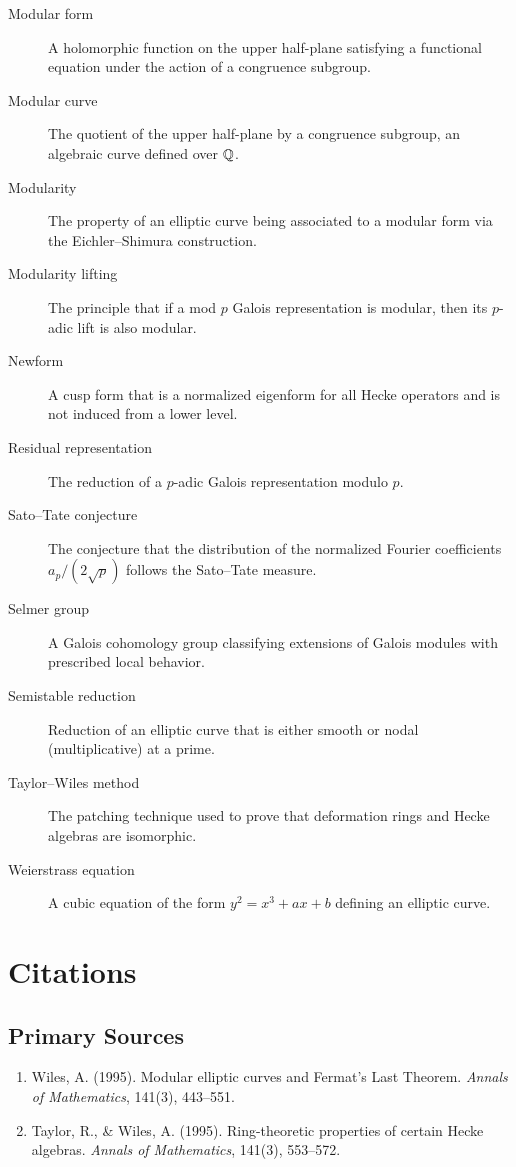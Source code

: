 \begin{description}
    \item[Modular form] A holomorphic function on the upper half-plane satisfying a functional equation under the action of a congruence subgroup.
    \item[Modular curve] The quotient of the upper half-plane by a congruence subgroup, an algebraic curve defined over \(\mathbb{Q}\).
    \item[Modularity] The property of an elliptic curve being associated to a modular form via the Eichler--Shimura construction.
    \item[Modularity lifting] The principle that if a mod \(p\) Galois representation is modular, then its \(p\)-adic lift is also modular.
    \item[Newform] A cusp form that is a normalized eigenform for all Hecke operators and is not induced from a lower level.
    \item[Residual representation] The reduction of a \(p\)-adic Galois representation modulo \(p\).
    \item[Sato--Tate conjecture] The conjecture that the distribution of the normalized Fourier coefficients \(a_p/(2\sqrt{p})\) follows the Sato--Tate measure.
    \item[Selmer group] A Galois cohomology group classifying extensions of Galois modules with prescribed local behavior.
    \item[Semistable reduction] Reduction of an elliptic curve that is either smooth or nodal (multiplicative) at a prime.
    \item[Taylor--Wiles method] The patching technique used to prove that deformation rings and Hecke algebras are isomorphic.
    \item[Weierstrass equation] A cubic equation of the form \(y^2 = x^3 + ax + b\) defining an elliptic curve.
\end{description}

\section{Citations}

\subsection*{Primary Sources}
\begin{enumerate}
    \item Wiles, A. (1995). Modular elliptic curves and Fermat's Last Theorem. \textit{Annals of Mathematics}, 141(3), 443--551.
    \item Taylor, R., \& Wiles, A. (1995). Ring-theoretic properties of certain Hecke algebras. \textit{Annals of Mathematics}, 141(3), 553--572.
\end{enumerate}


